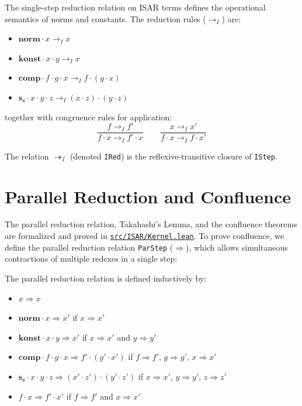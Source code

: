 \begin{definition}
The single-step reduction relation on ISAR terms defines the operational semantics of norms and constants. The reduction rules ($\to_I$) are:
\begin{itemize}
    \item $\mathbf{norm} \cdot x \to_I x$
    \item $\mathbf{konst} \cdot x \cdot y \to_I x$
    \item $\mathbf{comp} \cdot f \cdot g \cdot x \to_I f \cdot (g \cdot x)$
    \item $\mathbf{s_s} \cdot x \cdot y \cdot z \to_I (x \cdot z) \cdot (y \cdot z)$
\end{itemize}
together with congruence rules for application:
$$\frac{f \to_I f'}{f \cdot x \to_I f' \cdot x} \qquad \frac{x \to_I x'}{f \cdot x \to_I f \cdot x'}$$
\end{definition}

The relation $\twoheadrightarrow_I$ (denoted \texttt{IRed}) is the reflexive-transitive closure of \texttt{IStep}.

\section{Parallel Reduction and Confluence}

The parallel reduction relation, Takahashi's Lemma, and the confluence theorems are formalized and proved in \href{https://github.com/cypoe/isar-proofs/blob/master/src/ISAR/Kernel.lean}{\texttt{src/ISAR/Kernel.lean}}. To prove confluence, we define the parallel reduction relation \texttt{ParStep} ($\Rightarrow$), which allows simultaneous contractions of multiple redexes in a single step:

\begin{definition}
The parallel reduction relation is defined inductively by:
\begin{itemize}
    \item $x \Rightarrow x$
    \item $\mathbf{norm} \cdot x \Rightarrow x'$ if $x \Rightarrow x'$
    \item $\mathbf{konst} \cdot x \cdot y \Rightarrow x'$ if $x \Rightarrow x'$ and $y \Rightarrow y'$
    \item $\mathbf{comp} \cdot f \cdot g \cdot x \Rightarrow f' \cdot (g' \cdot x')$ if $f \Rightarrow f'$, $g \Rightarrow g'$, $x \Rightarrow x'$
    \item $\mathbf{s_s} \cdot x \cdot y \cdot z \Rightarrow (x' \cdot z') \cdot (y' \cdot z')$ if $x \Rightarrow x'$, $y \Rightarrow y'$, $z \Rightarrow z'$
    \item $f \cdot x \Rightarrow f' \cdot x'$ if $f \Rightarrow f'$ and $x \Rightarrow x'$
\end{itemize}
\end{definition}

